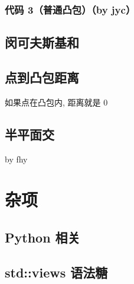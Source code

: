 \documentclass[12pt]{article}
\theoremstyle{definition}
\theoremstyle{remark}
\begin{document}


\newpage

\subsubsection{代码 3（普通凸包）（by jyc）}



\newpage

\subsection{闵可夫斯基和}



\subsection{点到凸包距离}

如果点在凸包内, 距离就是 0



\newpage

\subsection{半平面交}

by fhy



\newpage

{\centering\section{杂项}}

\subsection{Python 相关}



\newpage

\subsection{std::views 语法糖}


\end{document}
